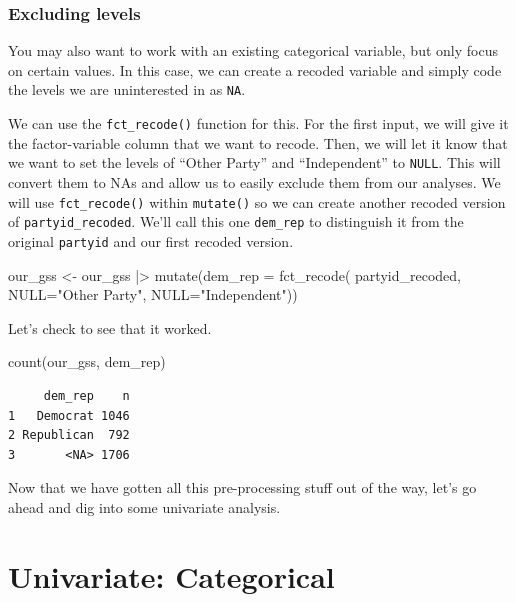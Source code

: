 \documentclass[
  letterpaper,
  DIV=11,
  numbers=noendperiod]{scrreprt}
\newenvironment{Shaded}{\begin{snugshade}}{\end{snugshade}}
\newcommand{\AttributeTok}[1]{\textcolor[rgb]{0.40,0.45,0.13}{#1}}
\newcommand{\FunctionTok}[1]{\textcolor[rgb]{0.28,0.35,0.67}{#1}}
\newcommand{\NormalTok}[1]{\textcolor[rgb]{0.00,0.23,0.31}{#1}}
\newcommand{\OtherTok}[1]{\textcolor[rgb]{0.00,0.23,0.31}{#1}}
\newcommand{\SpecialCharTok}[1]{\textcolor[rgb]{0.37,0.37,0.37}{#1}}
\newcommand{\StringTok}[1]{\textcolor[rgb]{0.13,0.47,0.30}{#1}}
\begin{document}
\subsection{Excluding levels}\label{excluding-levels}

You may also want to work with an existing categorical variable, but
only focus on certain values. In this case, we can create a recoded
variable and simply code the levels we are uninterested in as
\texttt{NA}.

We can use the \texttt{fct\_recode()} function for this. For the first
input, we will give it the factor-variable column that we want to
recode. Then, we will let it know that we want to set the levels of
``Other Party'' and ``Independent'' to \texttt{NULL}. This will convert
them to NAs and allow us to easily exclude them from our analyses. We
will use \texttt{fct\_recode()} within \texttt{mutate()} so we can
create another recoded version of \texttt{partyid\_recoded}. We'll call
this one \texttt{dem\_rep} to distinguish it from the original
\texttt{partyid} and our first recoded version.

\begin{Shaded}
\begin{Highlighting}[]
\NormalTok{our\_gss }\OtherTok{\textless{}{-}}\NormalTok{ our\_gss }\SpecialCharTok{|\textgreater{}}
  \FunctionTok{mutate}\NormalTok{(}\AttributeTok{dem\_rep =} \FunctionTok{fct\_recode}\NormalTok{(}
\NormalTok{    partyid\_recoded, }
    \AttributeTok{NULL=}\StringTok{"Other Party"}\NormalTok{, }
    \AttributeTok{NULL=}\StringTok{"Independent"}\NormalTok{))}
\end{Highlighting}
\end{Shaded}

Let's check to see that it worked.

\begin{Shaded}
\begin{Highlighting}[]
\FunctionTok{count}\NormalTok{(our\_gss, dem\_rep)}
\end{Highlighting}
\end{Shaded}

\begin{verbatim}
     dem_rep    n
1   Democrat 1046
2 Republican  792
3       <NA> 1706
\end{verbatim}

Now that we have gotten all this pre-processing stuff out of the way,
let's go ahead and dig into some univariate analysis.

\chapter{Univariate: Categorical}\label{univariate-categorical}
\end{document}
